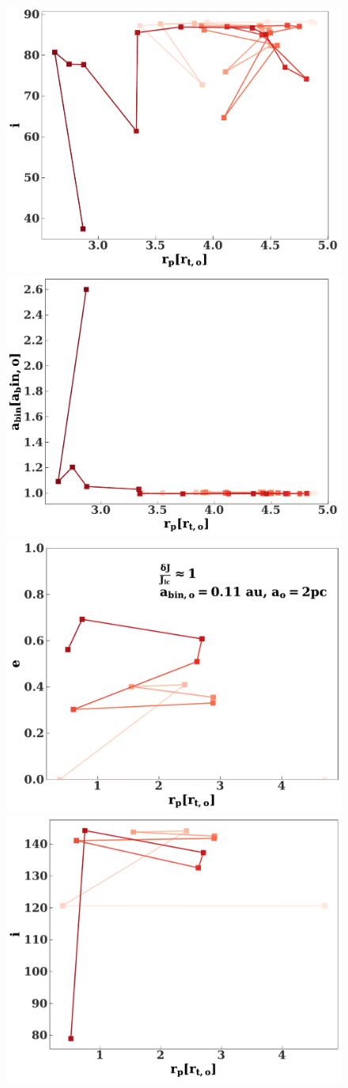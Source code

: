 \documentclass[fleqn,usenatbib]{mnras}
\begin{document}
\begin{figure}
    \includegraphics[width=0.66\columnwidth]{figures/isph_example_0.1.pdf}
    \includegraphics[width=0.66\columnwidth]{figures/asph_example_0.1.pdf}
    \includegraphics[width=0.66\columnwidth]{figures/esph_example_1.pdf}
    \includegraphics[width=0.66\columnwidth]{figures/isph_example_1.pdf}

\end{figure}
\end{document}
